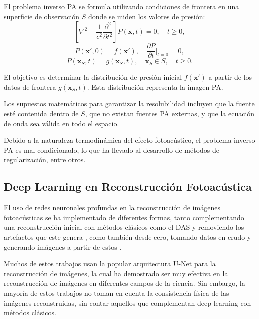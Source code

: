 El problema inverso PA se formula utilizando condiciones de frontera en una superficie de observación $S$ donde se miden los valores de presión:
\begin{equation}
    \left[ \nabla^2 - \frac{1}{c^2} \frac{\partial^2}{\partial t^2} \right] P(\mathbf{x},t) = 0, \quad t \geq 0,
\end{equation}
\begin{equation}
    P(\mathbf{x}', 0) = f(\mathbf{x}'), \quad \frac{\partial P}{\partial t} \Big|_{t=0} = 0,
\end{equation}
\begin{equation}
    P(\mathbf{x}_S, t) = g(\mathbf{x}_S, t), \quad \mathbf{x}_S \in S, \quad t \geq 0.
\end{equation}

El objetivo es determinar la distribución de presión inicial $f(\mathbf{x}')$ a partir de los datos de frontera $g(\mathbf{x}_S, t)$. Esta distribución representa la imagen PA.

Los supuestos matemáticos para garantizar la resolubilidad incluyen que la fuente esté contenida dentro de $S$, que no existan fuentes PA externas, y que la ecuación de onda sea válida en todo el espacio.

Debido a la naturaleza termodinámica del efecto fotoacústico, el problema inverso PA es mal condicionado, lo que ha llevado al desarrollo de métodos de regularización, entre otros.

\subsection{Deep Learning en Reconstrucción Fotoacústica}\label{sec:deep_learning_PA}

El uso de redes neuronales profundas en la reconstrucción de imágenes fotoacústicas se ha implementado de diferentes formas, tanto complementando una reconstrucción inicial con métodos clásicos como el DAS y removiendo los artefactos que este genera \cite{guan2020fully}, como también desde cero, tomando datos en crudo y generando imágenes a partir de estos \cite{Yang2021}.

Muchos de estos trabajos usan la popular arquitectura U-Net \cite{ronneberger2015unet} para la reconstrucción de imágenes, la cual ha demostrado ser muy efectiva en la reconstrucción de imágenes en diferentes campos de la ciencia. Sin embargo, la mayoría de estos trabajos no toman en cuenta la consistencia física de las imágenes reconstruidas, sin contar aquellos que complementan deep learning con métodos clásicos.

